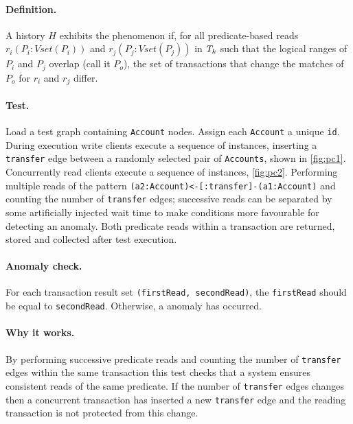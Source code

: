 \paragraph{Definition.}
A history $H$ exhibits the phenomenon  if, for all predicate-based reads $r_i(P_i : \textit{Vset}(P_i))$ and $r_j(P_j : \textit{Vset}(P_j))$ in $T_k$ such that the logical ranges of $P_i$ and $P_j$ overlap (call it $P_o$), the set of transactions that change the matches of $P_o$ for $r_i$ and $r_j$ differ.

\paragraph{Test.}
Load a test graph containing \texttt{Account} nodes. Assign each \texttt{Account} 
a unique \texttt{id}. During execution write clients execute a sequence of 
 instances, inserting a \texttt{transfer} edge between a 
randomly selected pair of \texttt{Accounts}, shown in \autoref{fig:pc1}. 
Concurrently read clients execute a sequence of  
instances, \autoref{fig:pc2}. Performing multiple reads of the pattern 
\texttt{(a2:Account)<-[:transfer]-(a1:Account)} and counting the number of 
\texttt{transfer} edges; successive reads can be separated by some artificially 
injected wait time to make conditions more favourable for detecting an anomaly.
Both predicate reads within a  transaction are returned, 
stored and collected after test execution.

\paragraph{Anomaly check.}
For each  transaction result set 
\texttt{(firstRead, secondRead)}, the \texttt{firstRead} should be equal to 
\texttt{secondRead}. Otherwise, a  anomaly has occurred.

\paragraph{Why it works.}
By performing successive predicate reads and counting the number of 
\texttt{transfer} edges within the same transaction this test checks that a 
system ensures consistent reads of the same predicate. If the number of 
\texttt{transfer} edges changes then a concurrent transaction has inserted a new
\texttt{transfer} edge and the reading transaction is not protected from this 
change.

